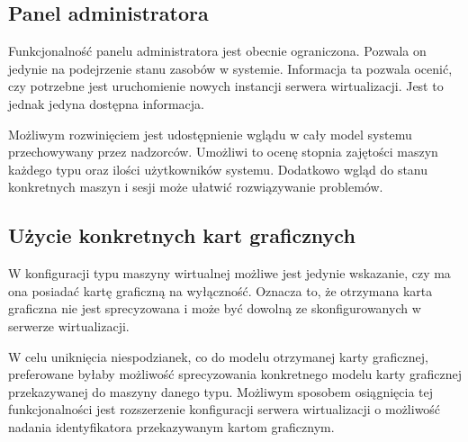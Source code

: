 \documentclass[../podsumowanie.tex]{subfiles}
\begin{document}
	\label{future_directions}

\subsection{Panel administratora}

Funkcjonalność panelu administratora jest obecnie ograniczona. Pozwala on jedynie na podejrzenie stanu zasobów w systemie. Informacja ta pozwala ocenić, czy potrzebne jest uruchomienie nowych instancji serwera wirtualizacji. Jest to jednak jedyna dostępna informacja.

Możliwym rozwinięciem jest udostępnienie wglądu w cały model systemu przechowywany przez nadzorców. Umożliwi to ocenę stopnia zajętości maszyn każdego typu oraz ilości użytkowników systemu. Dodatkowo wgląd do stanu konkretnych maszyn i sesji może ułatwić rozwiązywanie problemów.

\subsection{Użycie konkretnych kart graficznych}

W konfiguracji typu maszyny wirtualnej możliwe jest jedynie wskazanie, czy ma ona posiadać kartę graficzną na wyłączność. Oznacza to, że otrzymana karta graficzna nie jest sprecyzowana i może być dowolną ze skonfigurowanych w serwerze wirtualizacji.

W celu uniknięcia niespodzianek, co do modelu otrzymanej karty graficznej, preferowane byłaby możliwość sprecyzowania konkretnego modelu karty graficznej przekazywanej do maszyny danego typu. Możliwym sposobem osiągnięcia tej funkcjonalności jest rozszerzenie konfiguracji serwera wirtualizacji o możliwość nadania identyfikatora przekazywanym kartom graficznym.
\end{document}
